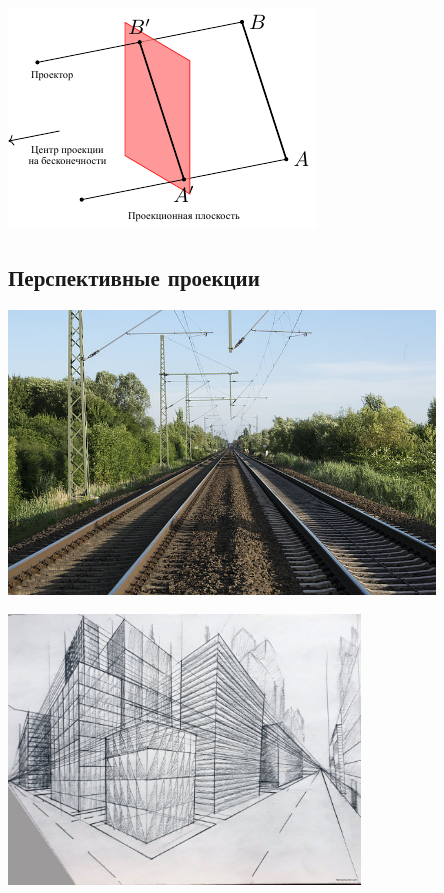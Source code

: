 \documentclass[10pt]{beamer}
\begin{document}
\begin{frame}
{    		\includegraphics[width=\textwidth]{Images/L3/parproj.pdf}
    	}
    	
    	
    \end{frame}
    
    \subsection{Перспективные проекции}
    
    {
    	\centering
    	\includegraphics[width=0.85\textwidth]{train-tracks-railroad-transportation-preview.jpg}
    }
    
    {
    	\centering
    	\includegraphics[width=0.7\textwidth]{1670050141_8-indasil-club-p-risunok-perspektiva-dlya-nachinayushchikh-9.jpg}
    }
    
\end{document}

